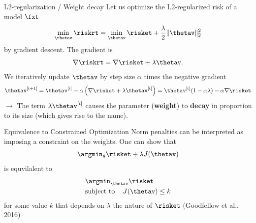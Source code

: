 \documentclass[11pt,compress,t,notes=noshow, xcolor=table]{beamer}
\begin{document}
\begin{vbframe}{L2-regularization / Weight decay}
Let us optimize the L2-regularized risk of a model $\fxt$
\[\min_{\thetav} \riskrt = \min_{\thetav} \risket + \frac{\lambda}{2} \|\thetav\|^2_2\]
by gradient descent. The gradient is
\[\nabla \riskrt = \nabla \risket + \lambda \thetav.\]
We iteratively update $\thetav$ by step size \(\alpha\) times the
negative gradient
\[\thetav^{[\text{t+1}]} = \thetav^{[\text{t}]} - \alpha \left(\nabla \risket + \lambda \thetav^{[\text{t}]}\right) =
\thetav^{[\text{t}]} (1 - \alpha \lambda) - \alpha \nabla \risket\]
$\to$ The term \(\lambda \thetav^{[t]}\) causes the parameter
(\textbf{weight}) to \textbf{decay} in proportion to its size (which gives rise to the name). 
\end{vbframe}


\begin{frame}{Equivalence to Constrained Optimization}
Norm penalties can be interpreted as imposing a constraint on the weights. One can show that 
 $$\argmin_{\theta} \risket + \lambda \text{\(J(\thetav)\)}$$
 is equvilalent to
 \begin{align*}
 & \argmin_{\thetav}  \risket \\
  &\text{subject to \;\;\;}  J(\thetav) \leq k
 \end{align*}
  for some value $k$ that depends on $\lambda$ the nature of 
 $\risket$ (Goodfellow et al., 2016)
\end{frame}
\end{document}
